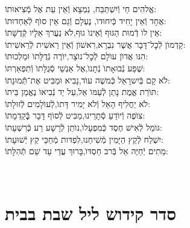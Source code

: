 \documentclass[twoside, openany, parskip=half, 11pt]{book}
\begin{document}
 אֱלהִים חַי וְֿיִשְׁתַּבַּח, \hfill נִמְצָא וְֿאֵין עֵת אֶל מְֿצִיאוּתוֹ: \\
אֶחָד וְֿאֵין יָחִיד כְּֿיִחוּדוׂ, \hfill נֶעְלָם וְֿגַם אֵין סוׂף לְֿאַחְדוּתוֹ: \\
 אֵין לוׂ דְֿמוּת הַגּוּף וְֿאֵינוׂ גוּף,\hfill לׂא נַעֲרךְ אֵלָיו קְֿדֻשָּׁתוֹ: \\
 קַדְמוׂן לְֿכׇל־דָּבָר אֲשֶׁר נִבְרָא,\hfill רִאשׁוׂן וְֿאֵין רֵאשִׁית לְֿרֵאשִׁיתוֹ: \\
 הִנּו אֲדוׂן עוׂלָם לְֿכׇל־נוׂצָר,\hfill יוׂרֶה גְֿדֻלָּתוׂ וּמַלְכוּתוֹ: \\
 שֶׁפַע נְֿבוּאָתוׂ נְֿתָנוׂ,\hfill אֶל אַנְשֵׁי סְֿגֻלָּתוׂ וְֿתִפְאַרְתּוֹ: \\
 לׂא קָם בְּֿיִשרָאֵל כְּֿמשֶׁה עוׂד,\hfill נָבִיא וּמַבִּיט אֶת־תְּֿֿמוּנָתוֹ: \\
 תּוׂרַת אֱמֶת נָתַן לְֿעַמּוׂ אֵל,\hfill עַל יַד נְֿבִיאוׂ נֶאֱמַן בֵּיתוֹ: \\
 לׂא יַחֲלִיף הָאֵל וְֿלׂא יָמִיר דָּתוׂ,\hfill לְֿעוׂלָמִים לְֿזוּלָתוֹ: \\
 צוׂפֶה וְֿיוׂדֵעַ סְֿתָרֵינוּ,\hfill מַבִּיט לְֿסוׂף דָּבָר בְְַּֿֿקַדְמָתוֹ: \\
 גּוׂמֵל לְֿאִישׁ חֶסֶד כְּֿמִפְעָלוׂ,\hfill נוׂתֵן לְֿרָשָׁע רַע כְּֿרִשְׁעָתוֹ: \\
 יִשְׁלַח לְֿקֵץ הַיָּמִין מְֿשִׁיחֵנוּ,\hfill לִפְדּות מְֿחַכֵּי קֵץ יְֿשׁוּעָתוֹ: \\
 מֵתִים יְֿחַיֶּה אֵל בְּֿרב חַסְדּוׂ,\hfill בָּרוּךְ עֲדֵי עַד שֵׁם תְּֿהִלָּתוֹ:\\

\vfill

\quad{}\quad{}\\

\chapter[קידוש ליל שבת]{ סדר קידוש ליל שבת בבית }



\medskip

\newcommand{\birkashabonim}{
\ssubsection{\adforn{18} ברכת הבנים \adforn{17}}

\source{בראשית מח} \begin{tabular}{>{\centering\arraybackslash}m{.4\textwidth} | >{\centering\arraybackslash}m{.4\textwidth}}
\instruction{לבנים} & \instruction{לבנות} \\
יְשִֽׂמְֿךָ֣ אֱלֹהִ֔ים כְּֿאֶפְרַ֖יִם וְֿכִמְנַשֶׁ֑ה &
יְשִׂמֵךְ אֱלׂהִים כְּֿשָׂרָה, רִבְקָה, רָחֵל, וְֿלֵאָה
 \end{tabular}


יְבָֽרֶכְֿךָ֥
\source{במידבר ו}
 יְיָ֖ וְֿיִשְׁמְֿרֶֽךָ׃\\
 יָאֵ֨ר יְיָ֧ פָּנָ֛יו אֵלֶ֖יךָ וִֽיחֻנֶּֽךָּ׃\\
 יִשָּׂ֨א יְיָ֤ פָּנָיו֙ אֵלֶ֔יךָ וְֿיָשֵׂ֥ם לְֿךָ֖ שָׁלֽוֹם׃


}
\end{document}
